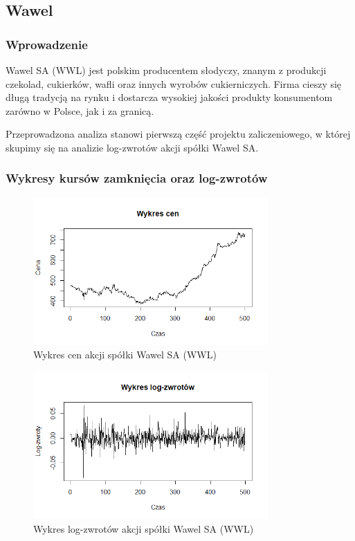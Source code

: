 \documentclass[a4paper,11pt]{article}
\begin{document}
\subsection{Wawel}

\subsubsection{Wprowadzenie}
Wawel SA (WWL) jest polskim producentem słodyczy, znanym z produkcji czekolad, cukierków, wafli oraz innych wyrobów cukierniczych. Firma cieszy się długą tradycją na rynku i dostarcza wysokiej jakości produkty konsumentom zarówno w Polsce, jak i za granicą.

Przeprowadzona analiza stanowi pierwszą część projektu zaliczeniowego, w której skupimy się na analizie log-zwrotów akcji spółki Wawel SA.

\subsubsection{Wykresy kursów zamknięcia oraz log-zwrotów}

\begin{figure}[H]
    \centering
    \includegraphics[width=0.8\textwidth]{./Wojtek/wykres-cen.png}
    \caption{Wykres cen akcji spółki Wawel SA (WWL)}
    \label{fig:wykres_cen}
\end{figure}

\begin{figure}[H]
    \centering
    \includegraphics[width=0.8\textwidth]{./Wojtek/wykres-log-zwrotow.png}
    \caption{Wykres log-zwrotów akcji spółki Wawel SA (WWL)}
    \label{fig:wykres_log_zwrotow}
\end{figure}
\end{document}
